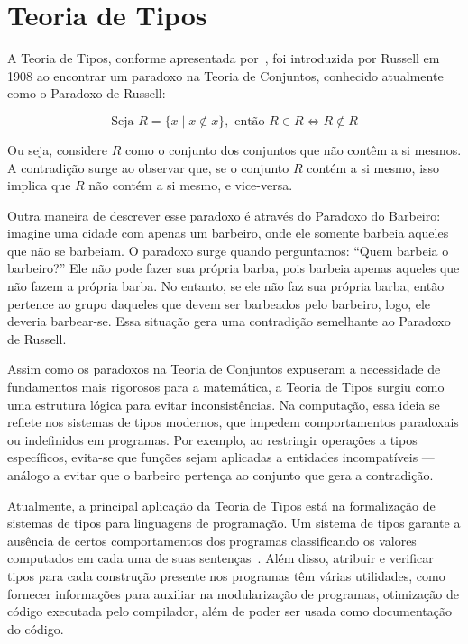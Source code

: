 \section{Teoria de Tipos}\label{sec:type-theory}

A Teoria de Tipos, conforme apresentada por~\cite{coquand2022type}, foi introduzida por Russell em 1908 ao encontrar um paradoxo na Teoria de Conjuntos, conhecido atualmente como o Paradoxo de Russell:

\begin{equation}\label{eq:russell-paradox}
  \text{Seja } R = \{ x \mid x \notin x \}, \text{ então } R \in R \iff R \notin R
\end{equation}

Ou seja, considere $R$ como o conjunto dos conjuntos que não contêm a si mesmos.
A contradição surge ao observar que, se o conjunto $R$ contém a si mesmo, isso implica que $R$ não contém a si mesmo, e vice-versa.

Outra maneira de descrever esse paradoxo é através do Paradoxo do Barbeiro: imagine uma cidade com apenas um barbeiro, onde ele somente barbeia aqueles que não se barbeiam.
O paradoxo surge quando perguntamos: ``Quem barbeia o barbeiro?''
Ele não pode fazer sua própria barba, pois barbeia apenas aqueles que não fazem a própria barba.
No entanto, se ele não faz sua própria barba, então pertence ao grupo daqueles que devem ser barbeados pelo barbeiro, logo, ele deveria barbear-se.
Essa situação gera uma contradição semelhante ao Paradoxo de Russell.

Assim como os paradoxos na Teoria de Conjuntos expuseram a necessidade de fundamentos mais rigorosos para a matemática, a Teoria de Tipos surgiu como uma estrutura lógica para evitar inconsistências.
Na computação, essa ideia se reflete nos sistemas de tipos modernos, que impedem comportamentos paradoxais ou indefinidos em programas.
Por exemplo, ao restringir operações a tipos específicos, evita-se que funções sejam aplicadas a entidades incompatíveis — análogo a evitar que o barbeiro pertença ao conjunto que gera a contradição.

Atualmente, a principal aplicação da Teoria de Tipos está na formalização de sistemas de tipos para linguagens de programação.
Um sistema de tipos garante a ausência de certos comportamentos dos programas classificando os valores computados em cada uma de suas sentenças~\cite{pierce2002types}.
Além disso, atribuir e verificar tipos para cada construção presente nos programas têm várias utilidades, como fornecer informações para auxiliar na modularização de programas, otimização de código executada pelo compilador, além de poder ser usada como documentação do código.

